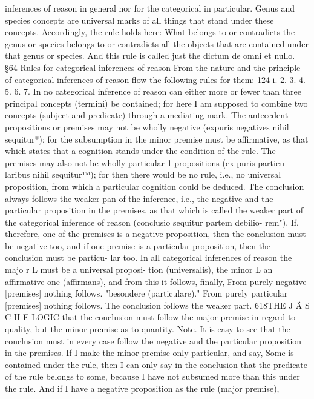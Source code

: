 inferences of reason in general nor for the categorical in particular.
Genus and species concepts are universal marks of all things that stand
under these concepts. Accordingly, the rule holds here: What belongs to or
contradicts the genus or species belongs to or contradicts all the objects that are
contained under that genus or species. And this rule is called just the dictum
de omni et nullo.
§64
Rules for categorical inferences of reason
From the nature and the principle of categorical inferences of reason flow
the following rules for them:
124
i.
2.
3.
4.
5.
6.
7.
In no categorical inference of reason can either more or fewer than three
principal concepts (termini) be contained; for here I am supposed to combine
two concepts (subject and predicate) through a mediating mark.
The antecedent propositions or premises may not be wholly negative (expuris
negatives nihil sequitur*); for the subsumption in the minor premise must be
affirmative, as that which states that a cognition stands under the condition of
the rule.
The premises may also not be wholly particular 1 propositions (ex puris particu-
laribus nihil sequitur™); for then there would be no rule, i.e., no universal
proposition, from which a particular cognition could be deduced.
The conclusion always follows the weaker pan of the inference, i.e., the negative and
the particular proposition in the premises, as that which is called the weaker
part of the categorical inference of reason (conclusio sequitur partem debilio-
rem"). If, therefore,
one of the premises is a negative proposition, then the conclusion must be
negative too, and
if one premise is a particular proposition, then the conclusion must be particu-
lar too.
In all categorical inferences of reason the majo r L must be a universal proposi-
tion (universalis), the minor L an affirmative one (affirmans), and from this it
follows, finally,
From purely negative [premises] nothing follows.
"besondere (particulare)."
From purely particular [premises] nothing follows.
The conclusion follows the weaker part.
618THE J Ä S C H E LOGIC
that the conclusion must follow the major premise in regard to quality, but the
minor premise as to quantity.
Note.
It is easy to see that the conclusion must in every case follow the negative
and the particular proposition in the premises.
If I make the minor premise only particular, and say, Some is contained
under the rule, then I can only say in the conclusion that the predicate of
the rule belongs to some, because I have not subsumed more than this under
the rule. And if I have a negative proposition as the rule (major premise),
